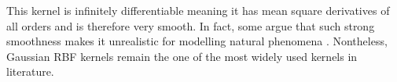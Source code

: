 



This kernel is infinitely differentiable meaning it has mean square derivatives of all orders and is therefore very smooth. In fact, some argue that such strong smoothness makes it unrealistic for modelling natural phenomena \cite{RasmussenCarlEdward2006Gpfm,SteinMichaelL1999IoSD}. Nontheless, Gaussian RBF kernels remain the one of the most widely used kernels in literature.